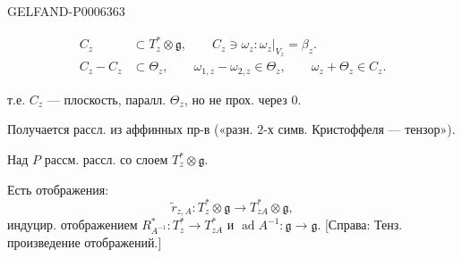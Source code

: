 \begin{GelfandAdjacentEvidence}{GELFAND-P000636}{3}


\[
\begin{aligned}
C_z&\subset T_z^*\otimes\mathfrak g,\qquad C_z\ni\omega_z:\omega_z|_{V_z}=\beta_z.\\
C_z-C_z&\subset\Theta_z,\qquad
\omega_{1,z}-\omega_{2,z}\in\Theta_z,\qquad
\omega_z+\Theta_z\in C_z.
\end{aligned}
\]
\end{GelfandAdjacentEvidence}


т.е. \(C_z\) --- плоскость, паралл. \(\Theta_z\), но не прох. через \(0\).

Получается рассл. из аффинных пр-в
(«разн. \(2\)-х симв. Кристоффеля --- тензор»).

Над \(P\) рассм. рассл. со слоем \(T_z^*\otimes\mathfrak g\).

Есть отображения:
\[
\widetilde r_{z,A}:T_z^*\otimes\mathfrak g\to T_{zA}^*\otimes\mathfrak g,
\]
индуцир. отображением
\(R_{A^{-1}}^*:T_z^*\to T_{zA}^*\) и
\(\operatorname{ad}A^{-1}:\mathfrak g\to\mathfrak g\).
[Справа: Тенз. произведение отображений.]


